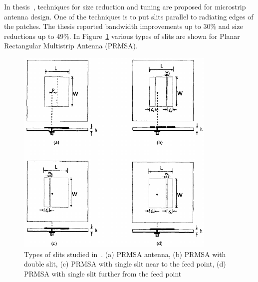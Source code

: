 \documentclass[12pt, oneandhalf, chaparabic, sees, ms]{metu}
\begin{document}
In thesis~\cite{bordoloi2013}, techniques for size reduction and tuning are proposed for microstrip antenna design.
One of the techniques is to put slits parallel to radiating edges of the patches. The thesis reported bandwidth improvements up to 30\% and 
size reductions up to 49\%. In Figure~\ref{fig:slits} various types of slits are shown for Planar Rectangular Multistrip Antenna (PRMSA). 
\vspace{1cm}
%
%
%
\begin{figure}[!htbp]
 \begin{center}
  \includegraphics[width=0.85\textwidth]{slits.png}
 \end{center}
 \caption{Types of slits studied in~\cite{bordoloi2013}. (a) PRMSA antenna, (b) PRMSA with double slit,  (c) PRMSA with single slit near to the feed point, 
 (d) PRMSA with single slit further from the feed point
}
  \label{fig:slits}
\end{figure}
% 
%
%

% 
% 
\newpage
\end{document}
